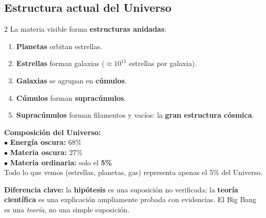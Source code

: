 \documentclass[11pt]{article}
\begin{document}
	\subsection{Estructura actual del Universo}
	\begin{multicols}{2}
		La materia visible forma \textbf{estructuras anidadas}:
		\begin{enumerate}[itemsep=3pt]
			\item \textbf{Planetas} orbitan estrellas.
			\item \textbf{Estrellas} forman galaxias ($\approx 10^{11}$ estrellas por galaxia).
			\item \textbf{Galaxias} se agrupan en \textbf{c\'umulos}.
			\item \textbf{C\'umulos} forman \textbf{suprac\'umulos}.
			\item \textbf{Suprac\'umulos} forman filamentos y vac\'ios: la \textbf{gran estructura c\'osmica}.
		\end{enumerate}
		\columnbreak
		\begin{databox}
			\textbf{Composici\'on del Universo:}\\
			$\bullet$ \textbf{Energ\'ia oscura:} 68\%\\
			$\bullet$ \textbf{Materia oscura:} 27\%\\
			$\bullet$ \textbf{Materia ordinaria:} solo el \textbf{5\%}\\[4pt]
			Todo lo que vemos (estrellas, planetas, gas) representa apenas el 5\% del Universo.
		\end{databox}
	\end{multicols}
	\begin{importantebox}
		\textbf{Diferencia clave:} la \textbf{hip\'otesis} es una suposici\'on no verificada; la \textbf{teor\'ia cient\'ifica} es una explicaci\'on ampliamente probada con evidencias. El Big Bang es una \textit{teor\'ia}, no una simple suposici\'on.
	\end{importantebox}
	\vspace{0.3cm}
\end{document}

